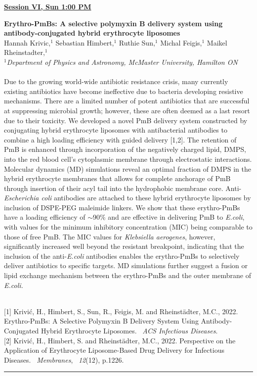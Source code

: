 \documentclass[titlepage,oneside,openany,10pt]{book}
\newenvironment{oralabswref}[5] %
        {
        \newcommand{\oralref}{#5}
        \begin{flushright}
                \underline{\textbf{#4}}
        \end{flushright}
        \textbf{#1}\\%
        #2\\%
        \textit{#3}\\\\%
        }
        {
        \vspace{0.5cm}
        \\\noindent \oralref \\ \noindent\rule{15cm}{0.5pt}%
        }
\begin{document}
\vspace{1cm}

\begin{oralabswref}
    {Erythro-PmBs: A selective polymyxin B delivery system using antibody-conjugated hybrid erythrocyte liposomes}
    {Hannah Krivic,$^{1}$ Sebastian Himbert,$^{1}$ Ruthie Sun,$^{1}$ Michal Feigis,$^{1}$ Maikel Rheinstadter,$^{1}$}
    {
    $^1$Department of Physics and Astronomy, McMaster University, Hamilton ON
    }
    {Session VI, Sun 1:00 PM}
    {
    {[1]} Krivić, H., Himbert, S., Sun, R., Feigis, M. and Rheinstädter, M.C., 2022. Erythro-PmBs: A Selective Polymyxin B Delivery System Using Antibody-Conjugated Hybrid Erythrocyte Liposomes.~ \emph{ACS Infectious Diseases}.\\
    {[2]} Krivić, H., Himbert, S. and Rheinst\"{a}dter, M.C., 2022. Perspective on the Application of Erythrocyte Liposome-Based Drug Delivery for Infectious Diseases.~ \emph{Membranes},~ \emph{12}(12), p.1226.
    }
    Due to the growing world-wide antibiotic resistance crisis, many currently existing antibiotics have become ineffective due to bacteria developing resistive mechanisms. There are a limited number of potent antibiotics that are successful at suppressing microbial growth; however, these are often deemed as a last resort due to their toxicity. We developed a novel PmB delivery system constructed by conjugating hybrid erythrocyte liposomes with antibacterial antibodies to combine a high loading efficiency with guided delivery {[}1,2{]}. The retention of PmB is enhanced through incorporation of the negatively charged lipid, DMPS, into the red blood cell's cytoplasmic membrane through electrostatic interactions. Molecular dynamics (MD) simulations reveal an optimal fraction of DMPS in the hybrid erythrocyte membranes that allows for complete anchorage of PmB through insertion of their acyl tail into the hydrophobic membrane core. Anti-\emph{Escherichia coli} antibodies are attached to these hybrid erythrocyte liposomes by inclusion of DSPE-PEG maleimide linkers. We show that these erythro-PmBs have a loading efficiency of $\sim$90\% and are effective in delivering PmB to \emph{E.coli}, with values for the minimum inhibitory concentration (MIC) being comparable to those of free PmB. The MIC values for \emph{Klebsiella aerogenes}, however, significantly increased well beyond the resistant breakpoint, indicating that the inclusion of the anti-\emph{E.coli} antibodies enables the erythro-PmBs to selectively deliver antibiotics to specific targets. MD simulations further suggest a fusion or lipid exchange mechanism between the erythro-PmBs and the outer membrane of \emph{E.coli.}
    \label{KrivicH}
\end{oralabswref}
\end{document}
